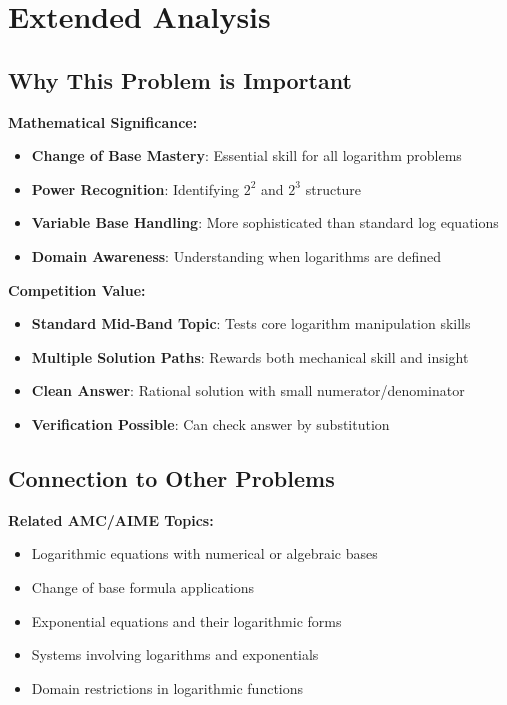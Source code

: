 \documentclass[12pt]{article}
\begin{document}
\section*{Extended Analysis}

\subsection*{Why This Problem is Important}

\textbf{Mathematical Significance:}
\begin{itemize}
    \item \textbf{Change of Base Mastery}: Essential skill for all logarithm problems
    \item \textbf{Power Recognition}: Identifying $2^2$ and $2^3$ structure
    \item \textbf{Variable Base Handling}: More sophisticated than standard log equations
    \item \textbf{Domain Awareness}: Understanding when logarithms are defined
\end{itemize}

\textbf{Competition Value:}
\begin{itemize}
    \item \textbf{Standard Mid-Band Topic}: Tests core logarithm manipulation skills
    \item \textbf{Multiple Solution Paths}: Rewards both mechanical skill and insight
    \item \textbf{Clean Answer}: Rational solution with small numerator/denominator
    \item \textbf{Verification Possible}: Can check answer by substitution
\end{itemize}

\subsection*{Connection to Other Problems}

\textbf{Related AMC/AIME Topics:}
\begin{itemize}
    \item Logarithmic equations with numerical or algebraic bases
    \item Change of base formula applications
    \item Exponential equations and their logarithmic forms
    \item Systems involving logarithms and exponentials
    \item Domain restrictions in logarithmic functions
\end{itemize}
\end{document}
